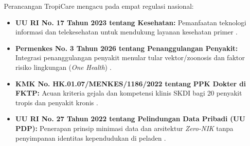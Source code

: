 Perancangan TropiCare mengacu pada empat regulasi nasional:
\begin{itemize}
    \item \textbf{UU RI No. 17 Tahun 2023 tentang Kesehatan:} Pemanfaatan teknologi informasi dan telekesehatan untuk mendukung layanan kesehatan primer \citep{UUKesehatan2023}.
    \item \textbf{Permenkes No. 3 Tahun 2026 tentang Penanggulangan Penyakit:} Integrasi penanggulangan penyakit menular tular vektor/zoonosis dan faktor risiko lingkungan (\textit{One Health}) \citep{Permenkes2026}.
    \item \textbf{KMK No. HK.01.07/MENKES/1186/2022 tentang PPK Dokter di FKTP:} Acuan kriteria gejala dan kompetensi klinis SKDI bagi 20 penyakit tropis dan penyakit kronis \citep{Kemenkes2022a}.
    \item \textbf{UU RI No. 27 Tahun 2022 tentang Pelindungan Data Pribadi (UU PDP):} Penerapan prinsip minimasi data dan arsitektur \textit{Zero-NIK} tanpa penyimpanan identitas kependudukan di peladen \citep{UUPDP2022}.
\end{itemize}
